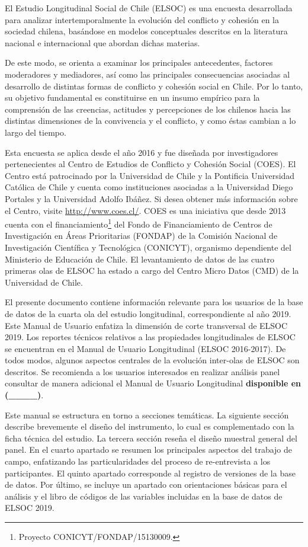 \documentclass[
]{book}
\begin{document}
El Estudio Longitudinal Social de Chile (ELSOC) es una encuesta desarrollada para analizar intertemporalmente la evolución del conflicto y cohesión en la sociedad chilena, basándose en modelos conceptuales descritos en la literatura nacional e internacional que abordan dichas materias.

De este modo, se orienta a examinar los principales antecedentes, factores moderadores y mediadores, así como las principales consecuencias asociadas al desarrollo de distintas formas de conflicto y cohesión social en Chile. Por lo tanto, su objetivo fundamental es constituirse en un insumo empírico para la comprensión de las creencias, actitudes y percepciones de los chilenos hacia las distintas dimensiones de la convivencia y el conflicto, y como éstas cambian a lo largo del tiempo.

Esta encuesta se aplica desde el año 2016 y fue diseñada por investigadores pertenecientes al Centro de Estudios de Conflicto y Cohesión Social (COES). El Centro está patrocinado por la Universidad de Chile y la Pontificia Universidad Católica de Chile y cuenta como instituciones asociadas a la Universidad Diego Portales y la Universidad Adolfo Ibáñez. Si desea obtener más información sobre el Centro, visite \url{http://www.coes.cl/}. COES es una iniciativa que desde 2013 cuenta con el financiamiento\footnote{Proyecto CONICYT/FONDAP/15130009.} del Fondo de Financiamiento de Centros de Investigación en Áreas Prioritarias (FONDAP) de la Comisión Nacional de Investigación Científica y Tecnológica (CONICYT), organismo dependiente del Ministerio de Educación de Chile. El levantamiento de datos de las cuatro primeras olas de ELSOC ha estado a cargo del Centro Micro Datos (CMD) de la Universidad de Chile.

El presente documento contiene información relevante para los usuarios de la base de datos de la cuarta ola del estudio longitudinal, correspondiente al año 2019. Este Manual de Usuario enfatiza la dimensión de corte transversal de ELSOC 2019. Los reportes técnicos relativos a las propiedades longitudinales de ELSOC se encuentran en el Manual de Usuario Longitudinal (ELSOC 2016-2017). De todos modos, algunos aspectos centrales de la evolución inter-olas de ELSOC son descritos. Se recomienda a los usuarios interesados en realizar análisis panel consultar de manera adicional el Manual de Usuario Longitudinal \textbf{disponible en (\_\_\_\_)}.

Este manual se estructura en torno a secciones temáticas. La siguiente sección describe brevemente el diseño del instrumento, lo cual es complementado con la ficha técnica del estudio. La tercera sección reseña el diseño muestral general del panel. En el cuarto apartado se resumen los principales aspectos del trabajo de campo, enfatizando las particularidades del proceso de re-entrevista a los participantes. El quinto apartado corresponde al registro de versiones de la base de datos. Por último, se incluye un apartado con orientaciones básicas para el análisis y el libro de códigos de las variables incluidas en la base de datos de ELSOC 2019.
\end{document}
